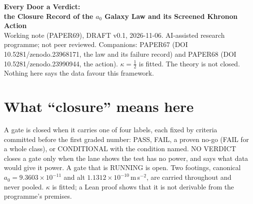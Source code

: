 \documentclass[10pt]{article}
\begin{document}
\begin{center}
{\Large\bfseries Every Door a Verdict:\\ the Closure Record of the $a_0$ Galaxy Law and its Screened Khronon Action}\\[6pt]
{\small Working note (PAPER69), DRAFT v0.1, 2026-11-06. AI-assisted research programme; not peer reviewed.
Companions: PAPER67 (DOI 10.5281/zenodo.23968171, the law and its failure record) and PAPER68 (DOI 10.5281/zenodo.23990944, the action).
$\kappa=\tfrac12$ is fitted. The theory is not closed. Nothing here says the data favour this framework.}
\end{center}

\begin{abstract}\noindent
``Closure'' here means that every gate the programme set itself has a frozen verdict, not that every gate passes.
On 2026-11-06 the programme ran each remaining gate for the galaxy law $g_N=g^2/(g+a_0)$, $a_0=\kappa c\sqrt{G\rho_{\rm DE}}$,
and for its adopted, scoped action (v3s; PAPER68) and candidate successor (AC2q). Each lane froze its criteria before any number was computed and ran a mutation twin that must fail.
The full covariant field equations of both actions are now derived and checked against direct variation.
Every step from the action to the observables is tagged as Lean-proved, symbolic, numerical or postulated.
The law passes SPARC on the action's exact field on both footings, along with the Solar System, PPN, the tensor speed and galaxy lensing.
It fails clusters, CMB lensing and linear growth. These are no-go results over every term the action has, not missed fits.
Among galaxies it fails the X-ray ellipticals, two ultra-diffuse galaxies (Malin 1, AGC 114905) and, on the canonical footing only, the $\Upsilon$-tilt row.
The failures form a single step: hot, pressure-supported systems sit 0.32--0.37\,dex above cold discs at matched baryonic mass, acceleration, depth, radius and gas fraction.
Five candidate keys for that step were each frozen and graded: environment, cold gas, kinematic support, morphology and IMF. None survives.
We list the gates that wait on data (Gaia DR4, a proposal-class ALMA sample) and the two that wait on the owner (adopting the stiffness repair; downloads).
\end{abstract}

\section{What ``closure'' means here}
A gate is closed when it carries one of four labels, each fixed by criteria committed before the first graded number: PASS, FAIL, a proven no-go (FAIL for a whole class), or CONDITIONAL with the condition named. NO VERDICT closes a gate only when the lane shows the test has no power, and says what data would give it power. A gate that is RUNNING is open. Two footings, canonical $a_0=9.3603\times10^{-11}$ and alt $1.1312\times10^{-10}$\,m\,s$^{-2}$, are carried throughout and never pooled. $\kappa$ is fitted; a Lean proof shows that it is not derivable from the programme's premises.
\end{document}
